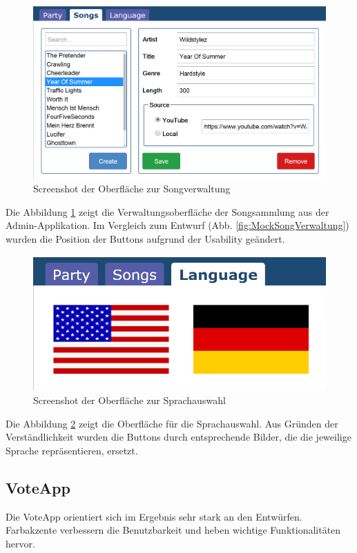 \begin{figure}[H]
\centering
\includegraphics[width=0.9\linewidth]{Bilder/Screenshot-Admin-Songs}
\caption{Screenshot der Oberfläche zur Songverwaltung}
\label{fig:Screenshot-Admin-Songs}
\end{figure}

Die Abbildung \ref{fig:Screenshot-Admin-Songs} zeigt die Verwaltungsoberfläche der Songsammlung aus der Admin-Applikation. Im Vergleich zum Entwurf (Abb. \ref{fig:MockSongVerwaltung}) wurden die Position der Buttons aufgrund der Usability geändert.

\begin{figure}[H]
\centering
\includegraphics[width=0.5\linewidth]{Bilder/Screenshot-Admin-Language}
\caption{Screenshot der Oberfläche zur Sprachauswahl}
\label{fig:Screenshot-Admin-Language}
\end{figure}

Die Abbildung \ref{fig:Screenshot-Admin-Language} zeigt die Oberfläche für die Sprachauswahl. Aus Gründen der Verständlichkeit wurden die Buttons durch entsprechende Bilder, die die jeweilige Sprache repräsentieren, ersetzt.

\newpage
\subsection{VoteApp}
Die VoteApp orientiert sich im Ergebnis sehr stark an den Entwürfen. Farbakzente verbessern die Benutzbarkeit und heben wichtige Funktionalitäten hervor.

